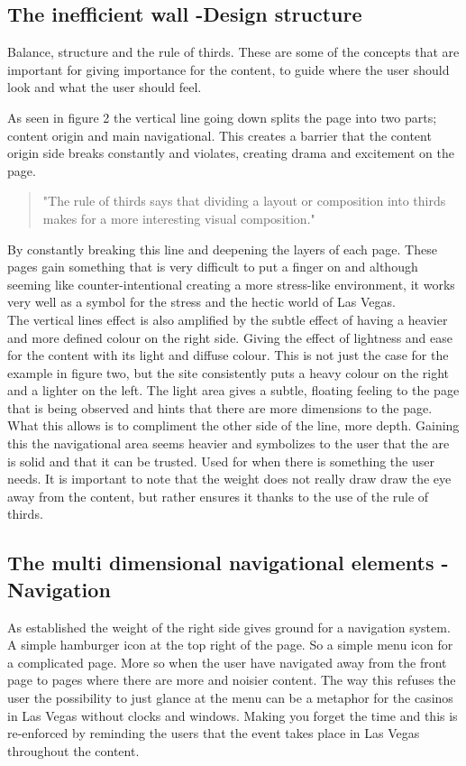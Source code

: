 \documentclass{article}
\begin{document}
        \subsection{The inefficient wall -Design structure}
        Balance, structure and the rule of thirds. These are some of the concepts that are important for giving importance for the content, to guide where the user should look and what the user should feel.
       
        As seen in figure 2 the vertical line going down splits the page into two parts; content origin and main navigational. This creates a barrier that the content origin side breaks constantly and violates, creating drama and excitement on the page. 
        \begin{quotation}
            "The rule of thirds says that dividing a layout or composition into thirds makes for a more interesting visual composition."
        \end{quotation} By constantly breaking this line and deepening the layers of each page. These pages gain something that is very difficult to put a finger on and although seeming like counter-intentional creating a more stress-like environment, it works very well as a symbol for the stress and the hectic world of Las Vegas.\\ The vertical lines effect is also amplified by the subtle effect of having a heavier and more defined colour on the right side. Giving the effect of lightness and ease for the content with its light and diffuse colour. This is not just the case for the example in figure two, but the site consistently puts a heavy colour on the right and a lighter on the left. The light area gives a subtle, floating feeling to the page that is being observed and hints that there are more dimensions to the page. What this allows is to compliment the other side of the line, more depth. Gaining this the navigational area seems heavier and symbolizes to the user that the are is solid and that it can be trusted. Used for when there is something the user needs. It is important to note that the weight does not really draw draw the eye away from the content, but rather ensures it thanks to the use of the rule of thirds.\\  
        \subsection{The multi dimensional navigational elements -Navigation}
        As established the weight of the right side gives ground for a navigation system. A simple hamburger icon at the top right of the page. So a simple menu icon for a complicated page. More so when the user have navigated away from the front page to pages where there are more and noisier content. The way this refuses the user the possibility to just glance at the menu can be a metaphor for the casinos in Las Vegas without clocks and windows. Making you forget the time and this is re-enforced by reminding the users that the event takes place in Las Vegas throughout the content.
       
\end{document}
